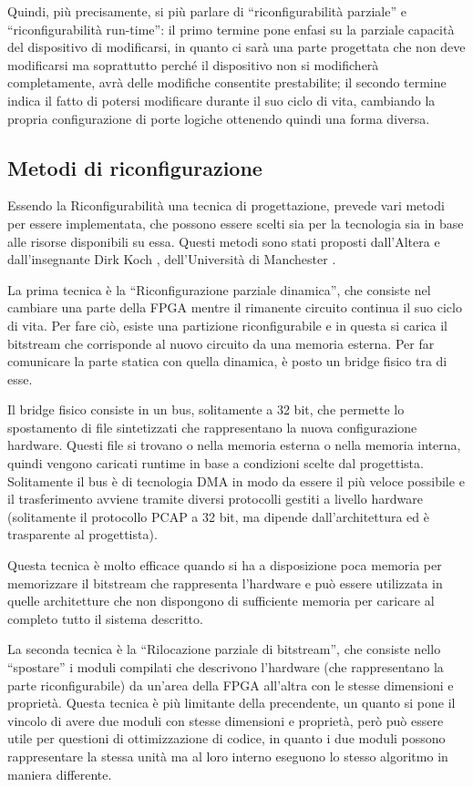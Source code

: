\documentclass[11pt]{article} %
\begin{document}
Quindi, più precisamente, si più parlare di ``riconfigurabilità parziale'' e ``riconfigurabilità run-time'': il primo termine pone enfasi su la parziale capacità del dispositivo di modificarsi, in quanto ci sarà una parte progettata che non deve modificarsi ma soprattutto perché il dispositivo non si modificherà completamente, avrà delle modifiche consentite prestabilite; il secondo termine indica il fatto di potersi modificare durante il suo ciclo di vita, cambiando la propria configurazione di porte logiche ottenendo quindi una forma diversa.

\subsection{Metodi di riconfigurazione}

Essendo la Riconfigurabilità una tecnica di progettazione, prevede vari metodi per essere implementata, che possono essere scelti sia per la tecnologia sia in base alle risorse disponibili su essa. Questi metodi sono stati proposti dall'Altera \cite{PR1} e dall'insegnante Dirk Koch , dell'Università di Manchester \cite{PR2}.

La prima tecnica è la ``Riconfigurazione parziale dinamica'', che consiste nel cambiare una parte della FPGA mentre il rimanente circuito continua il suo ciclo di vita. Per fare ciò, esiste una partizione riconfigurabile e in questa si carica il bitstream che corrisponde al nuovo circuito da una memoria esterna. Per far comunicare la parte statica con quella dinamica, è posto un bridge fisico tra di esse.

Il bridge fisico consiste in un bus, solitamente a 32 bit, che permette lo spostamento di file sintetizzati che rappresentano la nuova configurazione hardware. Questi file si trovano o nella memoria esterna o nella memoria interna, quindi vengono caricati runtime in base a condizioni scelte dal progettista. Solitamente il bus è di tecnologia DMA in modo da essere il più veloce possibile e il trasferimento avviene tramite diversi protocolli gestiti a livello hardware (solitamente il protocollo PCAP a 32 bit, ma dipende dall'architettura ed è trasparente al progettista).

Questa tecnica è molto efficace quando si ha a disposizione poca memoria per memorizzare il bitstream che rappresenta l'hardware e può essere utilizzata in quelle architetture che non dispongono di sufficiente memoria per caricare al completo tutto il sistema descritto.


La seconda tecnica è la ``Rilocazione parziale di bitstream'', che consiste nello ``spostare'' i moduli compilati che descrivono l'hardware (che rappresentano la parte riconfigurabile) da un'area della FPGA all'altra con le stesse dimensioni e proprietà. Questa tecnica è più limitante della precendente, un quanto si pone il vincolo di avere due moduli con stesse dimensioni e proprietà, però può essere utile per questioni di ottimizzazione di codice, in quanto i due moduli possono rappresentare la stessa unità ma al loro interno eseguono lo stesso algoritmo in maniera differente.
\end{document}
